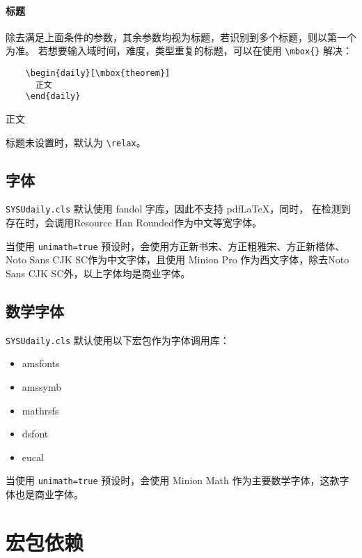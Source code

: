 \documentclass{SYSUDaily}
\begin{document}
\paragraph{标题}
除去满足上面条件的参数，其余参数均视为标题，若识别到多个标题，则以第一个为准。
若想要输入域时间，难度，类型重复的标题，可以在使用 \verb|\mbox{}| 解决：
\begin{multicols}{2}
	\begin{lstlisting}
    \begin{daily}[\mbox{theorem}]
      正文
    \end{daily}
  \end{lstlisting}
	\small
	\begin{daily}
		正文
	\end{daily}
\end{multicols}
标题未设置时，默认为 \verb|\relax|。

\subsection{字体}
\verb|SYSUdaily.cls| 默认使用 \textsf{fandol} 字库，因此不支持 pdf\LaTeX{}，同时，
在检测到存在时，会调用Resource Han Rounded作为中文等宽字体。

当使用 \verb|unimath=true| 预设时，会使用方正新书宋、方正粗雅宋、方正新楷体、Noto Sans CJK SC作为中文字体，且使用 Minion Pro 作为西文字体，除去Noto Sans CJK SC外，以上字体均是商业字体。

\subsection{数学字体}
\label{ssec:math_fonts}
\verb|SYSUdaily.cls| 默认使用以下宏包作为字体调用库：
\begin{itemize}[parsep=0pt,itemsep=0pt]
	\item
			\textsf{amsfonts}
	\item
			\textsf{amssymb}
	\item
			\textsf{mathrsfs}
	\item
			\textsf{dsfont}
	\item
			\textsf{eucal}
\end{itemize}
当使用 \verb|unimath=true| 预设时，会使用 Minion Math 作为主要数学字体，这款字体也是商业字体。

\section{宏包依赖}
\end{document}
